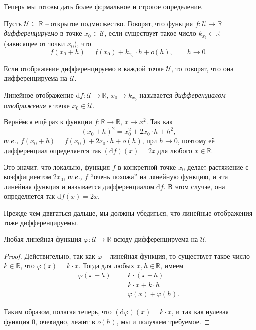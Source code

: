 Теперь мы готовы дать более формальное и строгое определение.

\begin{definition}\label{diff_of_function_on_R}
Пусть $\mathscr{U} \subseteq \mathbb{R}$ -- открытое подмножество. Говорят, что функция $f: \mathscr{U} \to \mathbb{R}$ \textit{дифференцируемо} в точке $x_0 \in \mathscr{U}$, если существует такое число $k_{x_0} \in \mathbb{R}$ (зависящее от точки $x_0$), что
\[
 f(x_0 + h)  = f(x_0) + k_{x_0}\cdot h + o(h), \qquad h\to 0.
\]

Если отображение дифференцируемо в каждой точке $\mathscr{U}$, то говорят, что она дифференцируема на $\mathscr{U}$.

Линейное отображение $\mathrm{d}f: \mathscr{U} \to \mathbb{R}$, $x_0 \mapsto k_{x_0}$ называется \textit{дифференциалом отображения} в точке $x_0 \in \mathscr{U}$. 
\end{definition}

\begin{example}
    Вернёмся ещё раз к функции $f:\mathbb{R} \to \mathbb{R}$, $x \mapsto x^2$. Так как
    \[
     (x_0 + h)^2 = x_0^2 + 2x_0\cdot h + h^2, 
    \]
\textit{т.е.,} $f(x_0 + h) = f(x_0) + 2x_0 \cdot h + o(h)$, при $h\to 0$, поэтому её дифференциал определяется так $(\mathrm{d}f)(x) = 2x$ для любого $x \in \mathbb{R}.$

Это значит, что локально, функция $f$ в конкретной точке $x_0$ делает растяжение с коэффициентом $2x_0$, \textit{т.е.,} $f$ ``очень похожа'' на линейную функцию, и эта линейная функция и называется дифференциалом $\mathrm{d}f$. В этом случае, она определяется так $\mathrm{d}f(x) = 2x$.
\end{example}

Прежде чем двигаться дальше, мы должны убедиться, что линейные отображения тоже дифференцируемы.

\begin{lemma}
 Любая линейная функция $\varphi: \mathscr{U} \to \mathbb{R}$ всюду дифференцируема на $\mathscr{U}$.
\end{lemma}
\begin{proof}
Действительно, так как $\varphi$ -- линейная функция, то существует такое число $k \in \mathbb{R}$, что $\varphi(x) = k\cdot x$. Тогда для любых $x,h \in \mathbb{R}$, имеем
\begin{eqnarray*}
 \varphi(x+h) &=& k\cdot (x+h) \\
 &=& k\cdot x + k \cdot h\\
 &=& \varphi(x) + \varphi(h).
\end{eqnarray*}

Таким образом, полагая теперь, что $(\mathrm{d}\varphi) (x)= k \cdot x$, и так как нулевая функция $0$, очевидно, лежит в $o(h)$, мы и получаем требуемое.
\end{proof}


